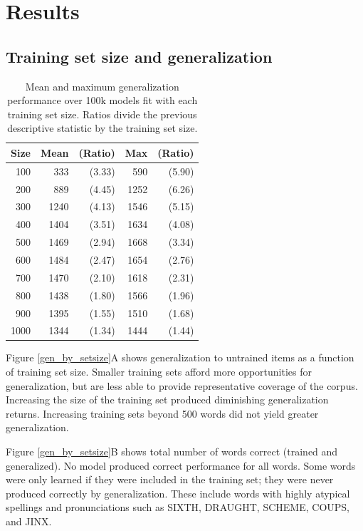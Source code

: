 \documentclass[10pt,letterpaper]{article}
\newcommand{\exword}[1]{\MakeUppercase{#1}}
\begin{document}
\section{Results}

\subsection{Training set size and generalization}
\begin{table}[b]
	\begin{center}
		\begin{tabular}{r r r r r}
			Size & Mean & (Ratio) & Max & (Ratio) \\
			\toprule
			100&333&(3.33)&590&(5.90)\\
			200&889&(4.45)&1252&(6.26)\\
			300&1240&(4.13)&1546&(5.15)\\
			400&1404&(3.51)&1634&(4.08)\\
			500&1469&(2.94)&1668&(3.34)\\
			600&1484&(2.47)&1654&(2.76)\\
			700&1470&(2.10)&1618&(2.31)\\
			800&1438&(1.80)&1566&(1.96)\\
			900&1395&(1.55)&1510&(1.68)\\
			1000&1344&(1.34)&1444&(1.44)\\
		\end{tabular}
		\caption{Mean and maximum generalization performance over 100k models fit with each training set size. Ratios divide the previous descriptive statistic by the training set size.}
	\end{center}
\end{table}

Figure \ref{gen_by_setsize}A shows generalization to untrained items as a function of training set size.  Smaller training sets afford more opportunities for generalization, but are less able to provide representative coverage of the corpus. Increasing the size of the training set produced diminishing generalization returns. Increasing training sets beyond 500 words did not yield greater generalization. 

Figure \ref{gen_by_setsize}B shows total number of words correct (trained and generalized). No model produced correct performance for all words. Some words were only learned if they were included in the training set; they were never produced correctly by generalization. These include words with highly atypical spellings and pronunciations such as \exword{sixth}, \exword{draught}, \exword{scheme}, \exword{coups}, and \exword{jinx}.  
\end{document}
